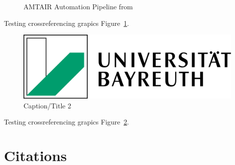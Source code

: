 \documentclass[12pt,a4paper]{report}
\begin{document}
\begin{figure}


\caption[Five-step AMTAIR automation pipeline from PDFs to Bayesian
networks]{\label{fig-automation_pipeline}AMTAIR Automation Pipeline from
\textcite{bucknall2022}}

\end{figure}%

Testing crossreferencing grapics Figure~\ref{fig-automation_pipeline}.

\begin{figure}

\includegraphics[width=0.3\linewidth,height=\textheight,keepaspectratio]{images/cover.png}

\caption[Short 2 caption]{\label{fig-testgraphic2}Caption/Title 2}

\end{figure}%

Testing crossreferencing grapics Figure~\ref{fig-testgraphic2}.

\section*{Citations}\label{sec-citations}
\end{document}

